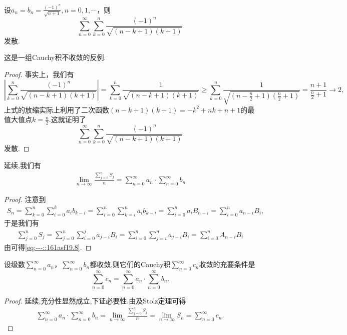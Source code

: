 \documentclass[../../main.tex]{subfiles}
\begin{document}
\begin{example}
设\(a_n = b_n = \frac{(-1)^n}{\sqrt{n + 1}}, n = 0,1,\cdots\)，则
\[
\sum_{n = 0}^{\infty} \sum_{k = 0}^{n} \frac{(-1)^n}{\sqrt{(n - k + 1)(k + 1)}}
\]
发散.
\end{example}
\begin{remark}
这是一组Cauchy积不收敛的反例.
\end{remark}
\begin{proof}
事实上，我们有
\[
\left| \sum_{k = 0}^{n} \frac{(-1)^n}{\sqrt{(n - k + 1)(k + 1)}} \right| = \sum_{k = 0}^{n} \frac{1}{\sqrt{(n - k + 1)(k + 1)}} \geqslant \sum_{k = 0}^{n} \frac{1}{\sqrt{\left(n - \frac{n}{2} + 1\right)\left(\frac{n}{2} + 1\right)}} = \frac{n + 1}{\frac{n}{2} + 1} \to 2,
\]
上式的放缩实际上利用了二次函数$\left( n-k+1 \right) \left( k+1 \right) =-k^2+nk+n+1$的最值大值点$k=\frac{n}{2}$.这就证明了
\[
\sum_{n = 0}^{\infty} \sum_{k = 0}^{n} \frac{(-1)^n}{\sqrt{(n - k + 1)(k + 1)}}
\]
发散.
\end{proof}

\begin{proposition}\label{proposition:命题3....4}
延续,我们有
\begin{align}
\lim\limits_{n\to\infty} \frac{\sum\limits_{j=0}^{n} S_j}{n} = \sum\limits_{n=0}^{\infty} a_n \cdot \sum\limits_{n=0}^{\infty} b_n
\label{eq:---::161asf19.8}
\end{align}
\end{proposition}
\begin{proof}
注意到
\begin{align*}
S_n = \sum\limits_{k=0}^{n} \sum\limits_{i=0}^{k} a_i b_{k-i} = \sum\limits_{i=0}^{n} \sum\limits_{k=i}^{n} a_i b_{k-i} = \sum\limits_{i=0}^{n} a_i B_{n-i} = \sum\limits_{i=0}^{n} a_{n-i} B_i,
\end{align*}
于是我们有
\begin{align*}
\sum\limits_{j=0}^{n} S_j = \sum\limits_{j=0}^{n} \sum\limits_{i=0}^{j} a_{j-i} B_i = \sum\limits_{i=0}^{n} \sum\limits_{j=i}^{n} a_{j-i} B_i = \sum\limits_{i=0}^{n} A_{n-i} B_i
\end{align*}
由可得\eqref{eq:---::161asf19.8}.
\end{proof}

\begin{corollary}\label{corollary:收敛级数Cauchy积收敛则就等于级数积}
设级数\(\sum_{n = 0}^{\infty} a_n\)，\(\sum_{n = 0}^{\infty} b_n\)都收敛,则它们的Cauchy积\(\sum_{n = 0}^{\infty} c_n\)收敛的充要条件是
\[
\sum_{n = 0}^{\infty} c_n = \sum_{n = 0}^{\infty} a_n \cdot \sum_{n = 0}^{\infty} b_n. 
\]
\end{corollary}
\begin{proof}
延续,充分性显然成立,下证必要性.由及Stolz定理可得
\begin{align*}
\sum_{n=0}^{\infty}{a_n}\cdot \sum_{n=0}^{\infty}{b_n}=\lim_{n\rightarrow \infty} \frac{\sum\limits_{j=0}^n{S_j}}{n}=\lim_{n\rightarrow \infty} S_n=\sum_{n=0}^{\infty}{c_n}.
\end{align*}
\end{proof}
\end{document}
